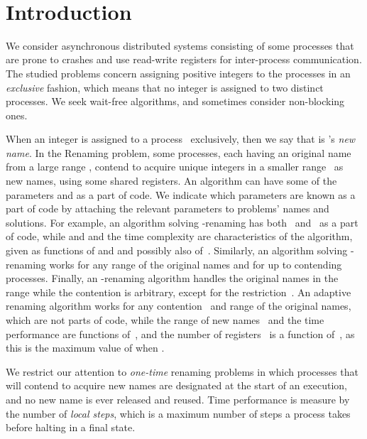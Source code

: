 \documentclass[11pt]{article}
\begin{document}
\vfill

~

\thispagestyle{empty}

\setcounter{page}{0}
\newpage




\section{Introduction}




We consider asynchronous distributed systems consisting of some  processes that are prone to crashes and use read-write registers for inter-process communication.
The studied problems concern assigning positive integers to the processes in an \emph{exclusive} fashion, which means that no integer is assigned to two distinct processes.
We seek wait-free algorithms, and sometimes consider non-blocking ones.

When an integer  is assigned to a process~ exclusively, then we say that  is 's  \emph{new name}. 
In the Renaming problem, some  processes, each having an original name from a large range , contend to acquire unique integers in a smaller range~  as new names, using some  shared registers.
An algorithm can have some of the parameters  and  as a part of code.
We indicate which parameters are known as a part of code by attaching the relevant parameters to problems' names and solutions.
For example, an algorithm solving -renaming has both~ and~ as a part of code, while  and  and the time complexity are characteristics of the algorithm, given as functions of  and  and possibly also of~.
Similarly, an algorithm solving -renaming works for any range  of the original names and for up to  contending processes.
Finally, an -renaming algorithm handles the original names in the range  while the contention  is arbitrary, except for the restriction~.
An adaptive renaming algorithm works for any contention~ and range  of the original names, which are not parts of code, while the range of new names~ and the time performance are  functions of~, and the number of registers~ is a function of~, as this is the maximum value of  when .

We restrict our attention to \emph{one-time} renaming problems in which processes that will contend to acquire new names are designated at the start of an execution, and no new name is ever released and reused. 
Time performance is measure by the number of \emph{local steps}, which is a maximum number of steps a process takes before halting in a final state.
\end{document}
